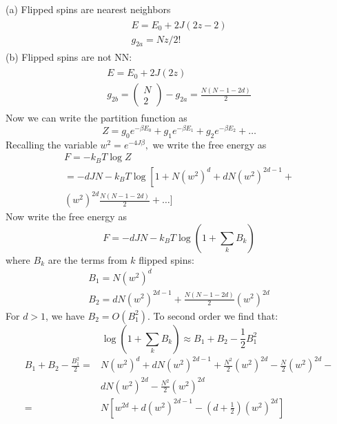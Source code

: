 \documentclass[12pt,titlepage]{article}
\numberwithin{equation}{section}
\begin{document}
(a) Flipped spins are nearest neighbors
\begin{align*}
    \begin{array}{l}{E=E_{0}+2 J(2 z-2)} \\ {g_{2 a}=N z / 2 !}\end{array}
\end{align*}
(b) Flipped spins are not NN:
\begin{align*}
    \begin{array}{l}{E=E_{0}+2 J(2 z)} \\ {g_{2 b}=\left(\begin{array}{c}{N} \\ {2}\end{array}\right)-g_{2a}=\frac{N(N-1-2 d)}{2}}\end{array}
\end{align*}
Now we can write the partition function as
\begin{equation}
Z=g_{0} e^{-\beta E_{0}}+g_{1} e^{-\beta E_{1}}+g_{2} e^{-\beta E_{2}}+\ldots
\end{equation}
Recalling the variable $w^{2}=e^{-4 J \beta},$ we write the free energy as
\begin{equation}
\begin{array}{c}{F=-k_{B} T \log Z} \\ {=-d J N-k_{B} T \log \left[1+N\left(w^{2}\right)^{d}+d N\left(w^{2}\right)^{2 d-1}+\right.} \\ {\left(w^{2}\right)^{2 d} \frac{N(N-1-2 d)}{2}+\ldots ]}\end{array}
\end{equation}
Now write the free energy as
\begin{equation}
F=-d J N-k_{B} T \log \left(1+\sum_{k} B_{k}\right)
\end{equation}
where $B_{k}$ are the terms from $k$ flipped spins:
\begin{equation}
\begin{array}{l}{B_{1}=N\left(w^{2}\right)^{d}} \\ {B_{2}=d N\left(w^{2}\right)^{2 d-1}+\frac{N(N-1-2 d)}{2}\left(w^{2}\right)^{2 d}}\end{array}
\end{equation}
For $d>1$, we have $B_{2}=O\left(B_{1}^{2}\right)$. To second order we find that:
\begin{equation}
\log \left(1+\sum_{k} B_{k}\right) \approx B_{1}+B_{2}-\frac{1}{2} B_{1}^{2}
\end{equation}
\begin{equation}
\begin{aligned} B_{1}+B_{2}-\frac{B_{1}^{2}}{2}=& N\left(w^{2}\right)^{d}+d N\left(w^{2}\right)^{2 d-1}+\frac{N^{2}}{2}\left(w^{2}\right)^{2 d}-\frac{N}{2}\left(w^{2}\right)^{2 d}-\\ & d N\left(w^{2}\right)^{2 d}-\frac{N^{2}}{2}\left(w^{2}\right)^{2 d} \\=& N\left[w^{2 d}+d\left(w^{2}\right)^{2 d-1}-\left(d+\frac{1}{2}\right)\left(w^{2}\right)^{2 d}\right] \end{aligned}
\end{equation}
\end{document}
